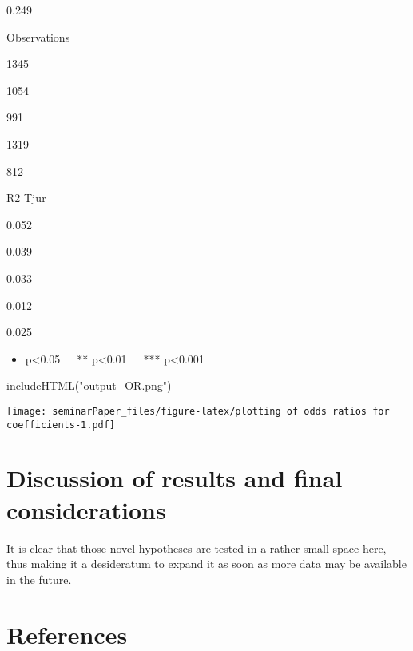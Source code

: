 \documentclass[
  12pt,
  english,
]{article}
\newenvironment{Shaded}{\begin{snugshade}}{\end{snugshade}}
\newcommand{\FunctionTok}[1]{\textcolor[rgb]{0.00,0.00,0.00}{#1}}
\newcommand{\NormalTok}[1]{#1}
\newcommand{\StringTok}[1]{\textcolor[rgb]{0.31,0.60,0.02}{#1}}
\providecommand{\tightlist}{%
  \setlength{\itemsep}{0pt}\setlength{\parskip}{0pt}}
\begin{document}
0.249

Observations

1345

1054

991

1319

812

R2 Tjur

0.052

0.039

0.033

0.012

0.025

\begin{itemize}
\tightlist
\item
  p\textless0.05~~~** p\textless0.01~~~*** p\textless0.001
\end{itemize}

\begin{Shaded}
\begin{Highlighting}[]
\FunctionTok{includeHTML}\NormalTok{(}\StringTok{"output\_OR.png"}\NormalTok{)}
\end{Highlighting}
\end{Shaded}

\texttt{[image: seminarPaper\_files/figure-latex/plotting of odds ratios for coefficients-1.pdf]}

\hypertarget{discussion-of-results-and-final-considerations}{%
\section{Discussion of results and final
considerations}\label{discussion-of-results-and-final-considerations}}

It is clear that those novel hypotheses are tested in a rather small
space here, thus making it a desideratum to expand it as soon as more
data may be available in the future.

\newpage{}

\hypertarget{references}{%
\section{References}\label{references}}
\end{document}
